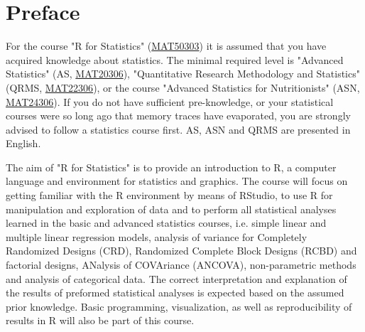 

\cleardoublepage\newpage

\thispagestyle{empty}

\graphicspath{{images/}}

\chapter*{Preface}\label{preface}


\noindent For the course "R for Statistics" (\href{https://wur.osiris-student.nl/#/onderwijscatalogus/extern/cursus?cursuscode=MAT50303&collegejaar=huidig}{MAT50303}) it is assumed that you have acquired knowledge about statistics. The minimal required level is "Advanced Statistics" (AS, \href{https://wur.osiris-student.nl/#/onderwijscatalogus/extern/cursus?cursuscode=MAT20306&collegejaar=huidig}{MAT20306}), "Quantitative Research Methodology and Statistics" (QRMS, \href{https://wur.osiris-student.nl/#/onderwijscatalogus/extern/cursus?cursuscode=MAT22306&collegejaar=huidig}{MAT22306}), or the course "Advanced Statistics for Nutritionists" (ASN, \href{https://wur.osiris-student.nl/#/onderwijscatalogus/extern/cursus?cursuscode=MAT24306&collegejaar=huidig}{MAT24306}). If you do not have sufficient pre-knowledge, or your statistical courses were so long ago that memory traces have evaporated, you are strongly advised to follow a statistics course first. AS, ASN and QRMS are presented in English.

The aim of "R for Statistics" is to provide an introduction to R, a computer language and environment for statistics and graphics. The course will focus on getting familiar with the R environment by means of RStudio, to use R for manipulation and exploration of data and to perform all statistical analyses learned in the basic and advanced statistics courses, i.e. simple linear and multiple linear regression models, analysis of variance for Completely Randomized Designs (CRD), Randomized Complete Block Designs (RCBD) and factorial designs, ANalysis of COVAriance (ANCOVA), non-parametric methods and analysis of categorical data. The correct interpretation and explanation of the results of preformed statistical analyses is expected based on the assumed prior knowledge. Basic programming, visualization, as well as reproducibility of results in R will also be part of this course.

